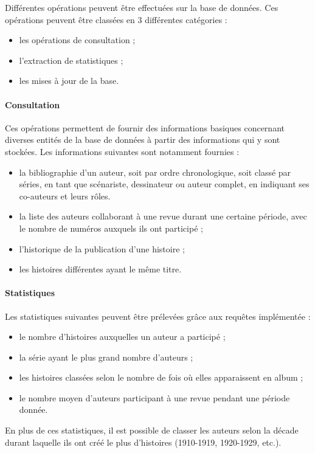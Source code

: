 \documentclass[12pt]{report}
\begin{document}
Différentes opérations peuvent être effectuées sur la base de données.
Ces opérations peuvent être classées en 3 différentes catégories :
\begin{itemize}
	\item les opérations de consultation ;
	\item l'extraction de statistiques ;
	\item les mises à jour de la base.
\end{itemize}

\paragraph{Consultation}
Ces opérations permettent de fournir des informations basiques concernant
diverses entités de la base de données à partir des informations qui y sont
stockées.
Les informations suivantes sont notamment fournies :
\begin{itemize}
	\item la bibliographie d’un auteur, soit par ordre chronologique, soit classé par séries, en tant que
		scénariste, dessinateur ou auteur complet, en indiquant ses co-auteurs et leurs rôles.
	\item la liste des auteurs collaborant à une revue durant une certaine période, avec le nombre de
		numéros auxquels ils ont participé ;
	\item l'historique de la publication d’une histoire ;
	\item les histoires différentes ayant le même titre.
\end{itemize}

\paragraph{Statistiques}
Les statistiques suivantes peuvent être prélevées grâce aux requêtes
implémentée :
\begin{itemize}
	\item le nombre d’histoires auxquelles un auteur a participé ;
	\item la série ayant le plus grand nombre d’auteurs ;
	\item les histoires classées selon le nombre de fois où elles apparaissent en album ;
	\item le nombre moyen d’auteurs participant à une revue pendant une période donnée.
\end{itemize}
En plus de ces statistiques, il est possible de classer les auteurs selon la
décade durant laquelle ils ont créé le plus d’histoires (1910-1919, 1920-1929,
etc.).
\end{document}
